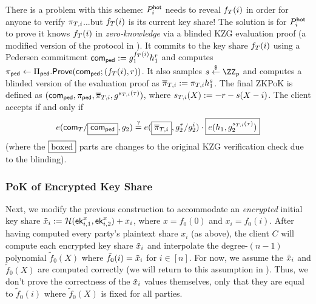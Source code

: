 There is a problem with this scheme: $P_i^{\mathsf{hot}}$ needs to reveal $f_{T}(i)$ in order for anyone to verify $\pi_{T,i}$...but $f_{T}(i)$ is its current key share! The solution is for $P_i^{\mathsf{hot}}$ to prove it knows $f_{T}(i)$ in \emph{zero-knowledge} via a blinded KZG evaluation proof (a modified version of the protocol in \cite[\S6.1]{CCS:ZBKMNS22}).
It commits to the key share $f_{T}(i)$ using a Pedersen commitment $\mathsf{com}_{\sf ped} := g_1^{f_{T}(i)} h_1^r$
and computes $\pi_{\sf ped} \gets \Pi_{\sf ped}.\mathsf{Prove}(\mathsf{com}_{\sf ped}; (f_{T}(i), r))$. 
It also samples $s \sample \ZZ_p$ and computes a blinded version of the evaluation proof as $\overline{\pi}_{T,i} := \pi_{T,i} h_1^s$.
The final ZKPoK is defined as $(\mathsf{com}_{\sf ped}, \pi_{\sf ped}, \overline{\pi}_{T,i}, g^{s_{T,i}(\tau)})$, where $s_{T,i}(X) := -r - s(X-i)$. The client accepts if and only if 
\[
    e(\mathsf{com}_{T}/\boxed{\mathsf{com}_{\sf ped}}, g_2)
    \stackrel{?}{=}
    e(\boxed{\overline{\pi}_{T,i}}, g_2^\tau/g_2^i) \cdot \boxed{e(h_1, g_2^{s_{T,i}(\tau)})} 
\]
(where the $\boxed{\text{boxed}}$ parts are changes to the original KZG verification check due to the blinding).

\subsubsection{PoK of Encrypted Key Share}\label{subsec:enc_pok}

Next, we modify the previous construction to accommodate an \emph{encrypted} initial key share $\tilde{x}_i := \mathcal{H}(\mathsf{ek}_{i,1}^x, \mathsf{ek}_{i,2}^x) + x_i$, where $x = f_0(0)$ and $x_i = f_0(i)$. After having computed every party's plaintext share $x_i$ (as above), the client $C$ will compute each encrypted key share $\tilde{x}_i$ and interpolate the degree-$(n-1)$ polynomial $\tilde{f}_0(X)$ where $\tilde{f}_0(i) = \tilde{x}_i$ for $i \in [n]$. 
For now, we assume the $\tilde{x}_i$ and $\tilde{f}_0(X)$ are computed correctly (we will return to this assumption in ). Thus, we don't prove the correctness of the $\tilde{x}_i$ values themselves, only that they are equal to $\tilde{f}_0(i)$ where $\tilde{f}_0(X)$ is fixed for all parties.

